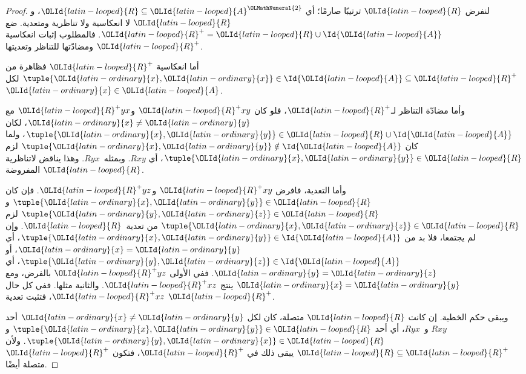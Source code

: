 \documentclass[../../../include/open-logic-section]{subfiles}
\begin{document}
\begin{proof}
لنفرض $\OLId{latin-looped}{R}$ ترتيبًا صارمًا؛ أي $\OLId{latin-looped}{R} \subseteq \OLId{latin-looped}{A}^\OLMathNumeral{2}$، و$\OLId{latin-looped}{R}$ لا انعكاسية
ولا تناظرية ومتعدية. ضع $\OLId{latin-looped}{R}^+ = \OLId{latin-looped}{R} \cup \Id{\OLId{latin-looped}{A}}$. فالمطلوب إثبات
انعكاسية $\OLId{latin-looped}{R}^+$ ومضادّتها للتناظر وتعديتها.

أما انعكاسية $\OLId{latin-looped}{R}^+$ فظاهرة من $\tuple{\OLId{latin-ordinary}{x}, \OLId{latin-ordinary}{x}} \in \Id{\OLId{latin-looped}{A}} \subseteq
\OLId{latin-looped}{R}^+$ لكل $\OLId{latin-ordinary}{x} \in \OLId{latin-looped}{A}$.

وأما مضادّة التناظر لـ$\OLId{latin-looped}{R}^+$، فلو كان $\OLId{latin-looped}{R}^+xy$ و$\OLId{latin-looped}{R}^+yx$ مع
$\OLId{latin-ordinary}{x} \neq \OLId{latin-ordinary}{y}$، لكان $\tuple{\OLId{latin-ordinary}{x},\OLId{latin-ordinary}{y}} \in \OLId{latin-looped}{R} \cup \Id{\OLId{latin-looped}{A}}$، ولما كان
$\tuple{\OLId{latin-ordinary}{x}, \OLId{latin-ordinary}{y}} \notin \Id{\OLId{latin-looped}{A}}$ لزم $\tuple{\OLId{latin-ordinary}{x}, \OLId{latin-ordinary}{y}} \in \OLId{latin-looped}{R}$، أي
$Rxy$. وبمثله~$Ryx$. وهذا يناقض لاتناظرية $\OLId{latin-looped}{R}$ المفروضة.

وأما التعدية، فافرض $\OLId{latin-looped}{R}^+xy$ و$\OLId{latin-looped}{R}^+yz$. فإن كان
$\tuple{\OLId{latin-ordinary}{x}, \OLId{latin-ordinary}{y}} \in \OLId{latin-looped}{R}$ و$\tuple{\OLId{latin-ordinary}{y},\OLId{latin-ordinary}{z}} \in \OLId{latin-looped}{R}$ لزم $\tuple{\OLId{latin-ordinary}{x}, \OLId{latin-ordinary}{z}} \in
\OLId{latin-looped}{R}$ من تعدية~$\OLId{latin-looped}{R}$. وإن لم يجتمعا، فلا بد من
$\tuple{\OLId{latin-ordinary}{x}, \OLId{latin-ordinary}{y}} \in \Id{\OLId{latin-looped}{A}}$، أي $\OLId{latin-ordinary}{x} = \OLId{latin-ordinary}{y}$، أو $\tuple{\OLId{latin-ordinary}{y}, \OLId{latin-ordinary}{z}} \in \Id{\OLId{latin-looped}{A}}$،
أي $\OLId{latin-ordinary}{y} = \OLId{latin-ordinary}{z}$. ففي الأولى $\OLId{latin-looped}{R}^+yz$ بالفرض، ومع $\OLId{latin-ordinary}{x} = \OLId{latin-ordinary}{y}$ ينتج
$\OLId{latin-looped}{R}^+xz$. والثانية مثلها. ففي كل حال $\OLId{latin-looped}{R}^+xz$، فتثبت تعدية $\OLId{latin-looped}{R}^+$.

ويبقى حكم الخطية. إن كانت $\OLId{latin-looped}{R}$ متصلة، كان لكل $\OLId{latin-ordinary}{x} \neq \OLId{latin-ordinary}{y}$ أحد
$Rxy$ و~$Ryx$، أي أحد $\tuple{\OLId{latin-ordinary}{x}, \OLId{latin-ordinary}{y}} \in \OLId{latin-looped}{R}$ و$\tuple{\OLId{latin-ordinary}{y}, \OLId{latin-ordinary}{x}} \in \OLId{latin-looped}{R}$.
ولأن $\OLId{latin-looped}{R} \subseteq \OLId{latin-looped}{R}^+$ يبقى ذلك في $\OLId{latin-looped}{R}^+$، فتكون $\OLId{latin-looped}{R}^+$ متصلة أيضًا.
\end{proof}
\end{document}
